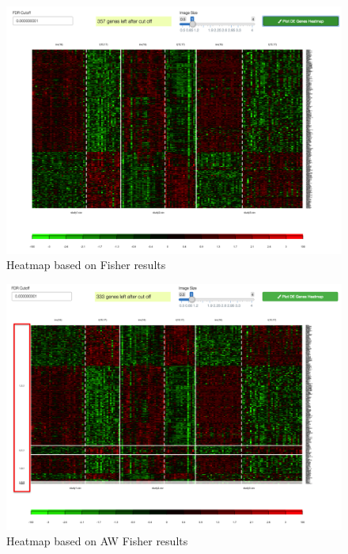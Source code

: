 \begin{figure}[H]
\begin{center}
\includegraphics[scale=0.4]{./figure/metaDE/FisherHeatmap}
\caption{Heatmap based on Fisher results}
\label{fig:FisherHeatmap}
\end{center}
\end{figure}

\begin{figure}[H]
\begin{center}
\includegraphics[scale=0.45]{./figure/metaDE/AWFisherHeatmap}
\caption{Heatmap based on AW Fisher results}
\label{fig:AWFisherHeatmap}
\end{center}
\end{figure}

